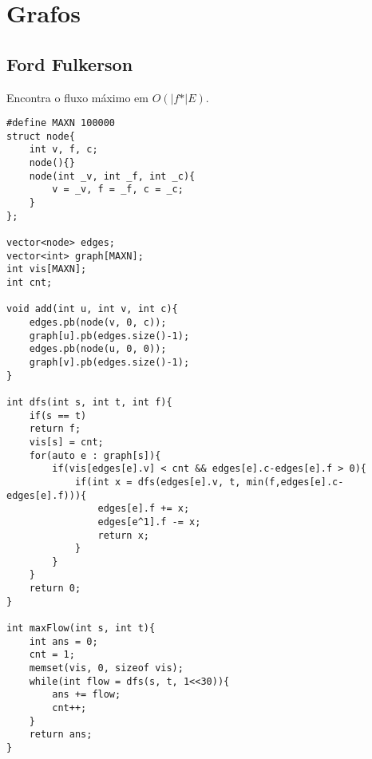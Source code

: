 \chapter{Grafos}

\section{Ford Fulkerson}

Encontra o fluxo máximo em $O(|\textit{f*}|E)$.
\begin{multicols}{2}
	\begin{lstlisting}
#define MAXN 100000
struct node{
	int v, f, c;
	node(){}
	node(int _v, int _f, int _c){
		v = _v, f = _f, c = _c;
	}
};

vector<node> edges;
vector<int> graph[MAXN];
int vis[MAXN];
int cnt;

void add(int u, int v, int c){
	edges.pb(node(v, 0, c));
	graph[u].pb(edges.size()-1);
	edges.pb(node(u, 0, 0));
	graph[v].pb(edges.size()-1);
}

int dfs(int s, int t, int f){
	if(s == t)
	return f;
	vis[s] = cnt;
	for(auto e : graph[s]){
		if(vis[edges[e].v] < cnt && edges[e].c-edges[e].f > 0){
			if(int x = dfs(edges[e].v, t, min(f,edges[e].c-edges[e].f))){
				edges[e].f += x;
				edges[e^1].f -= x;
				return x;
			}
		}
	}
	return 0;
}

int maxFlow(int s, int t){
	int ans = 0;
	cnt = 1;
	memset(vis, 0, sizeof vis);
	while(int flow = dfs(s, t, 1<<30)){
		ans += flow;
		cnt++;
	}
	return ans;
}
	\end{lstlisting}
\end{multicols}